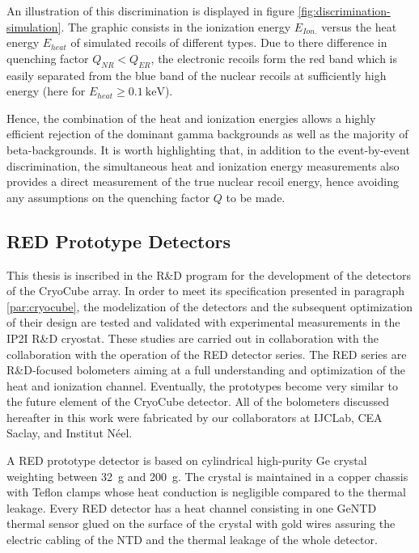 An illustration of this discrimination is displayed in figure \ref{fig:discrimination-simulation}. The graphic consists in the ionization energy $E_{Ion.}$ versus the heat energy $E_{heat}$ of simulated recoils of different types. Due to there difference in quenching factor $Q_{NR} < Q_{ER}$, the electronic recoils form the red band which is easily separated from the blue band of the nuclear recoils at sufficiently high energy (here for $E_{heat} \geq \SI{0.1}{\kilo\eV}$).  

Hence, the combination of the heat and ionization energies allows a highly efficient rejection of the dominant gamma backgrounds as well as the majority of beta-backgrounds. It is worth highlighting  that, in addition to the event-by-event discrimination, the simultaneous heat and ionization energy measurements also provides a direct measurement of the true nuclear recoil energy, hence avoiding any assumptions on the quenching factor $Q$ to be made. 




\subsection{RED Prototype Detectors}

This thesis is inscribed in the R\&D program for the development of the detectors of the CryoCube array. In order to meet its specification presented in paragraph \ref{par:cryocube}, the modelization of the detectors and the subsequent optimization of their design are tested and validated with experimental measurements in the IP2I R\&D cryostat.
These studies are carried out in collaboration with the \Edelweiss{} collaboration with the operation of the RED detector series. The RED series are R\&D-focused bolometers aiming at a full understanding and optimization of the heat and ionization channel. Eventually, the prototypes become very similar to the future element of the CryoCube detector. All of the bolometers discussed hereafter in this work were fabricated by our collaborators at IJCLab, CEA Saclay, and Institut Néel. 

A RED prototype detector is based on cylindrical high-purity Ge crystal weighting between \SI{32}{\g} and \SI{200}{\g}. The crystal is maintained in a copper chassis with Teflon clamps whose heat conduction is negligible compared to the thermal leakage. Every RED detector has a heat channel consisting in one GeNTD thermal sensor glued on the surface of the crystal with gold wires assuring the electric cabling of the NTD and the thermal leakage of the whole detector. 

